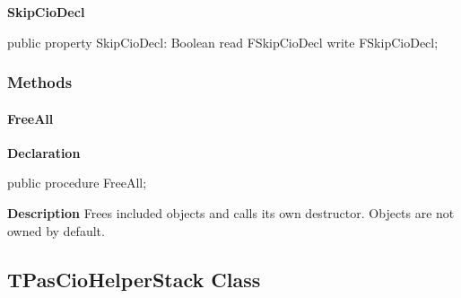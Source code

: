\documentclass{report}
\newif\ifpdf
\begin{document}
\begin{list}{}
\begin{flushleft}
\ifpdf
\end{flushleft}
\fi


\par  \label{PasDoc_Parser.TPasCioHelper-SkipCioDecl}
\item[\textbf{SkipCioDecl}\hfill]
\ifpdf
\begin{flushleft}
\fi
\begin{ttfamily}
public property SkipCioDecl: Boolean read FSkipCioDecl write FSkipCioDecl;\end{ttfamily}

\ifpdf
\end{flushleft}
\fi


\par  \end{list}
\subsubsection*{\large{\textbf{Methods}}\normalsize\hspace{1ex}\hfill}
\paragraph*{FreeAll}\hspace*{\fill}

\label{PasDoc_Parser.TPasCioHelper-FreeAll}
\begin{list}{}{
\setlength{\itemindent}{0cm}
\setlength{\listparindent}{0cm}
\setlength{\leftmargin}{\evensidemargin}
\addtolength{\leftmargin}{\tmplength}
\settowidth{\labelsep}{X}
\addtolength{\leftmargin}{\labelsep}
\setlength{\labelwidth}{\tmplength}
}
\item[\textbf{Declaration}\hfill]
\ifpdf
\begin{flushleft}
\fi
\begin{ttfamily}
public procedure FreeAll;\end{ttfamily}

\ifpdf
\end{flushleft}
\fi

\par
\item[\textbf{Description}]
Frees included objects and calls its own destructor. Objects are not owned by default.

\end{list}
\ifpdf
\subsection*{\large{\textbf{TPasCioHelperStack Class}}\normalsize\hspace{1ex}\hrulefill}
\else
\end{document}
